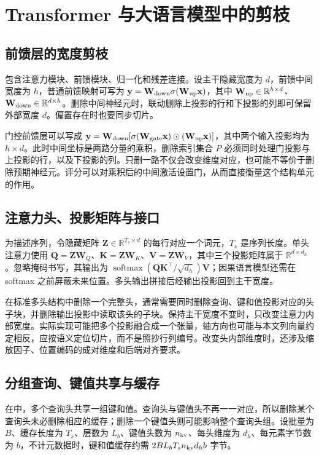 \documentclass[UTF8,12pt,a4paper,fontset=fandol]{ctexart}
\begin{document}
\section{Transformer 与大语言模型中的剪枝}
\label{sec:prune-transformer}

\subsection{前馈层的宽度剪枝}
包含注意力模块、前馈模块、归一化和残差连接。设主干隐藏宽度为 $d$，前馈中间宽度为 $h$，普通前馈映射可写为 $\mathbf y=\mathbf W_{\rm down}\sigma(\mathbf W_{\rm up}\mathbf x)$，其中 $\mathbf W_{\rm up}\in\mathbb R^{h\times d}$、$\mathbf W_{\rm down}\in\mathbb R^{d\times h}$。删除中间神经元时，联动删除上投影的行和下投影的列即可保留外部宽度 $d$。偏置存在时也要同步切片。

门控前馈层可以写成 $\mathbf y=\mathbf W_{\rm down}[\sigma(\mathbf W_{\rm gate}\mathbf x)\odot(\mathbf W_{\rm up}\mathbf x)]$，其中两个输入投影均为 $h\times d$。此时中间坐标是两路分量的乘积，删除索引集合 $P$ 必须同时处理门投影与上投影的行，以及下投影的列。只删一路不仅会改变维度对应，也可能不等价于删除预期神经元。评分可以对乘积后的中间激活设置门，从而直接衡量这个结构单元的作用。

\subsection{注意力头、投影矩阵与接口}
为描述序列，令隐藏矩阵 $\mathbf Z\in\mathbb R^{T_s\times d}$ 的每行对应一个词元，$T_s$ 是序列长度。单头注意力使用 $\mathbf Q=\mathbf Z\mathbf W_Q$、$\mathbf K=\mathbf Z\mathbf W_K$、$\mathbf V=\mathbf Z\mathbf W_V$，其中三个投影矩阵属于 $\mathbb R^{d\times d_h}$。忽略掩码书写，其输出为 $\operatorname{softmax}(\mathbf Q\mathbf K^\top/\sqrt{d_h})\mathbf V$；因果语言模型还需在 softmax 之前屏蔽未来位置。多头输出拼接后经输出投影回到主干宽度。

在标准多头结构中删除一个完整头，通常需要同时删除查询、键和值投影对应的头子块，并删除输出投影中读取该头的子块。保持主干宽度不变时，只改变注意力内部宽度。实际实现可能把多个投影融合成一个张量，轴方向也可能与本文列向量约定相反，应按语义定位切片，而不是照抄行列编号。改变头内部维度时，还涉及缩放因子、位置编码的成对维度和后端对齐要求。

\subsection{分组查询、键值共享与缓存}
在中，多个查询头共享一组键和值。查询头与键值头不再一一对应，所以删除某个查询头未必删除相应的缓存；删除一个键值头则可能影响整个查询头组。设批量为 $B$、缓存长度为 $T_s$、层数为 $L_b$、键值头数为 $n_{\rm kv}$、每头维度为 $d_h$、每元素字节数为 $b$，不计元数据时，键和值缓存约需 $2BL_bT_sn_{\rm kv}d_hb$ 字节。
\end{document}
